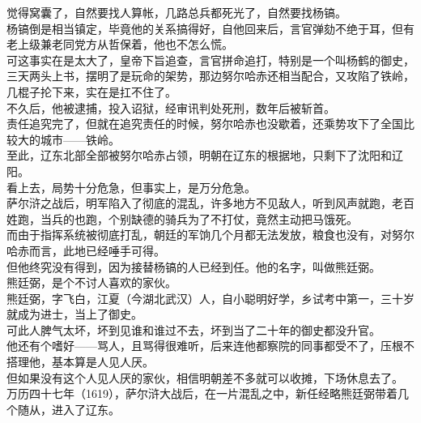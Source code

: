 \begin{multicols}{\theparacolNo}
觉得窝囊了，自然要找人算帐，几路总兵都死光了，自然要找杨镐。\\

杨镐倒是相当镇定，毕竟他的关系搞得好，自他回来后，言官弹劾不绝于耳，但有老上级兼老同党方从哲保着，他也不怎么慌。\\

可这事实在是太大了，皇帝下旨追查，言官拼命追打，特别是一个叫杨鹤的御史，三天两头上书，摆明了是玩命的架势，那边努尔哈赤还相当配合，又攻陷了铁岭，几棍子抡下来，实在是扛不住了。\\

不久后，他被逮捕，投入诏狱，经审讯判处死刑，数年后被斩首。\\

责任追究完了，但就在追究责任的时候，努尔哈赤也没歇着，还乘势攻下了全国比较大的城市——铁岭。\\

至此，辽东北部全部被努尔哈赤占领，明朝在辽东的根据地，只剩下了沈阳和辽阳。\\

看上去，局势十分危急，但事实上，是万分危急。\\

萨尔浒之战后，明军陷入了彻底的混乱，许多地方不见敌人，听到风声就跑，老百姓跑，当兵的也跑，个别缺德的骑兵为了不打仗，竟然主动把马饿死。\\

而由于指挥系统被彻底打乱，朝廷的军饷几个月都无法发放，粮食也没有，对努尔哈赤而言，此地已经唾手可得。\\

但他终究没有得到，因为接替杨镐的人已经到任。他的名字，叫做熊廷弼。\\

熊廷弼，是个不讨人喜欢的家伙。\\

熊廷弼，字飞白，江夏（今湖北武汉）人，自小聪明好学，乡试考中第一，三十岁就成为进士，当上了御史。\\

可此人脾气太坏，坏到见谁和谁过不去，坏到当了二十年的御史都没升官。\\

他还有个嗜好——骂人，且骂得很难听，后来连他都察院的同事都受不了，压根不搭理他，基本算是人见人厌。\\

但如果没有这个人见人厌的家伙，相信明朝差不多就可以收摊，下场休息去了。\\

万历四十七年（1619），萨尔浒大战后，在一片混乱之中，新任经略熊廷弼带着几个随从，进入了辽东。\\


\end{multicols}
